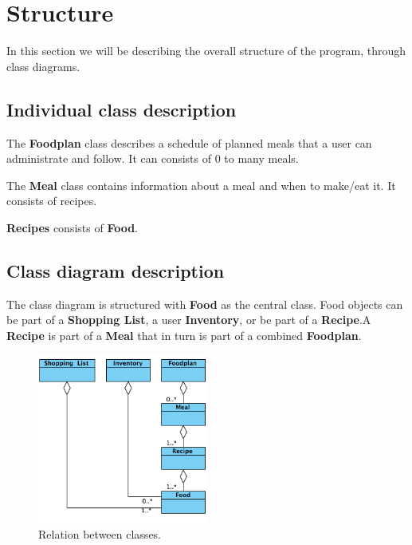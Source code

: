 \section{Structure}
In this section we will be describing the overall structure of the program, through class diagrams.


\subsection{Individual class description}
The \textbf{Foodplan} class describes a schedule of planned meals that a user can administrate and follow.
It can consists of 0 to many meals.

The \textbf{Meal} class contains information about a meal and when to make/eat it. It consists of recipes.

\textbf{Recipes} consists of \textbf{Food}.

\subsection{Class diagram description}
The class diagram is structured with \textbf{Food} as the central class. Food objects can be part of a \textbf{Shopping List}, a user \textbf{Inventory}, or be part of a \textbf{Recipe}.A \textbf{Recipe} is part of a \textbf{Meal} that in turn is part of a combined \textbf{Foodplan}.

\begin{figure}[H]
	\centering
	\includegraphics[width=0.50\textwidth]{Grafik/FoodPlanner/FoodPlannerClassDiagram.png}
	\caption{Relation between classes.}
\end{figure}

